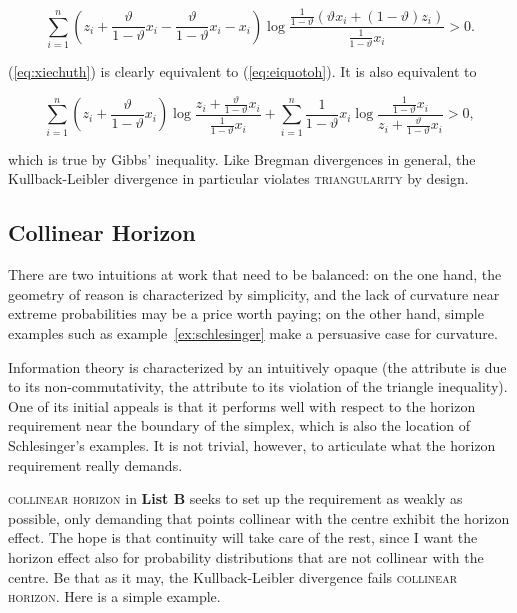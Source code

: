 \documentclass[smallextended]{svjour3}       %
\begin{document}
\begin{equation}
  \label{eq:xiechuth}
  \sum_{i=1}^{n}\left(z_{i}+\frac{\vartheta}{1-\vartheta}x_{i}-\frac{\vartheta}{1-\vartheta}x_{i}-x_{i}\right)\log\frac{\frac{1}{1-\vartheta}\left(\vartheta{}x_{i}+(1-\vartheta)z_{i}\right)}{\frac{1}{1-\vartheta}x_{i}}>0.
\end{equation}

(\ref{eq:xiechuth}) is clearly equivalent to (\ref{eq:eiquotoh}). It
is also equivalent to

\begin{equation}
  \label{eq:ohrohshi}
  \sum_{i=1}^{n}\left(z_{i}+\frac{\vartheta}{1-\vartheta}x_{i}\right)\log\frac{z_{i}+\frac{\vartheta}{1-\vartheta}x_{i}}{\frac{1}{1-\vartheta}x_{i}}+
  \sum_{i=1}^{n}\frac{1}{1-\vartheta}x_{i}\log\frac{\frac{1}{1-\vartheta}x_{i}}{z_{i}+\frac{\vartheta}{1-\vartheta}x_{i}}>0,
\end{equation}

which is true by Gibbs' inequality. Like Bregman divergences in
general, the Kullback-Leibler divergence in particular violates
\textsc{triangularity} by design.

\subsection{Collinear Horizon}
\label{subsec:colhor}

There are two intuitions at work that need to be balanced: on the one
hand, the geometry of reason is characterized by simplicity, and the
lack of curvature near extreme probabilities may be a price worth
paying; on the other hand, simple examples such as
example~\ref{ex:schlesinger} make a persuasive case for curvature.

Information theory is characterized by an intuitively opaque
 (the attribute  is due to its
non-commutativity, the attribute  to its violation of the
triangle inequality). One of its initial appeals is that it performs
well with respect to the horizon requirement near the boundary of the
simplex, which is also the location of Schlesinger's examples. It is
not trivial, however, to articulate what the horizon requirement
really demands.

\textsc{collinear horizon} in \textbf{List B} seeks to set up the requirement
as weakly as possible, only demanding that points collinear with the
centre exhibit the horizon effect. The hope is that continuity will
take care of the rest, since I want the horizon effect also for
probability distributions that are not collinear with the centre. Be
that as it may, the Kullback-Leibler divergence fails
\textsc{collinear horizon}. Here is a simple example.
\end{document}
